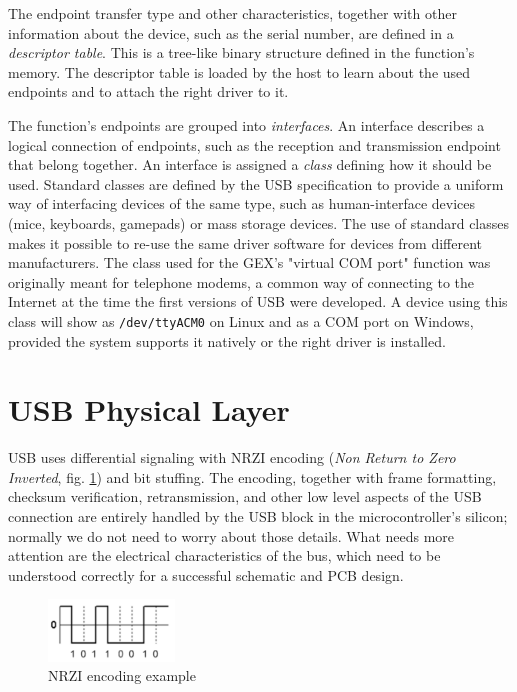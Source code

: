 The endpoint transfer type and other characteristics, together with other information about the device, such as the serial number, are defined in a \textit{descriptor table}. This is a tree-like binary structure defined in the function's memory. The descriptor table is loaded by the host to learn about the used endpoints and to attach the right driver to it.

The function's endpoints are grouped into \textit{interfaces}. An interface describes a logical connection of endpoints, such as the reception and transmission endpoint that belong together. An interface is assigned a \textit{class} defining how it should be used. Standard classes are defined by the USB specification to provide a uniform way of interfacing devices of the same type, such as human-interface devices (mice, keyboards, gamepads) or mass storage devices. The use of standard classes makes it possible to re-use the same driver software for devices from different manufacturers. The class used for the GEX's "virtual COM port" function was originally meant for telephone modems, a common way of connecting to the Internet at the time the first versions of USB were developed. A device using this class will show as \verb|/dev/ttyACM0| on Linux and as a COM port on Windows, provided the system supports it natively or the right driver is installed.




\newpage


\section{USB Physical Layer}

USB uses differential signaling with NRZI encoding (\textit{Non Return to Zero Inverted}, fig. \ref{fig:nrzi}) and bit stuffing. The encoding, together with frame formatting, checksum verification, retransmission, and other low level aspects of the USB connection are entirely handled by the USB block in the microcontroller's silicon; normally we do not need to worry about those details. What needs more attention are the electrical characteristics of the bus, which need to be understood correctly for a successful schematic and PCB design.

\begin{figure}
	\centering
	\includegraphics[width=0.3\textwidth]{img/usb-nrzi-diagram.png}
	\caption{\label{fig:nrzi}NRZI encoding example}
\end{figure}

